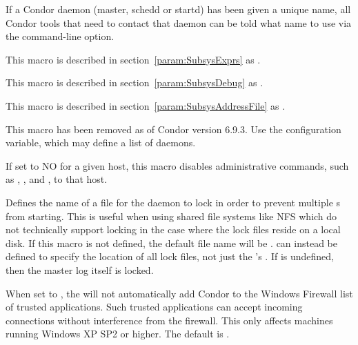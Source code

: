 \begin{description}
  If a Condor daemon (master, schedd or startd) has been given a
  unique name, all Condor tools that need to contact that daemon can
  be told what name to use via the  command-line option.


\label{param:MasterExprs}
\item[\Macro{MASTER\_ATTRS}]
  This macro is described in section~\ref{param:SubsysExprs} as
  .

\label{param:MasterDebug}
\item[\Macro{MASTER\_DEBUG}]
  This macro is described in section~\ref{param:SubsysDebug} as
  .

\label{param:MasterAddressFile}
\item[\Macro{MASTER\_ADDRESS\_FILE}]
  This macro is described in
  section~\ref{param:SubsysAddressFile} as
  . 

\label{param:SecondaryCollectorList}
\item[\Macro{SECONDARY\_COLLECTOR\_LIST}]
  This macro has been removed as of Condor version 6.9.3.
  Use the  configuration variable, which may define a
  list of  daemons.

\label{param:AllowAdminCommands}
\item[\Macro{ALLOW\_ADMIN\_COMMANDS}]
  If set to NO for a given host, this
  macro disables administrative commands, such as 
  , , and , to that host.

\label{param:MasterInstanceLock}
\item[\Macro{MASTER\_INSTANCE\_LOCK}]
  Defines the name of a file for the  daemon
  to lock in order to prevent multiple s
  from starting.
  This is useful when using shared file systems like NFS which do
  not technically support locking in the case where the lock files
  reside on a local disk.
  If this macro is not defined, the default file name will be
  .
   can instead be defined to
  specify the location of all lock files, not just the 
  's .
  If  is undefined, then the master log itself is locked.

\label{param:AddWindowsFirewallException}
\item[\Macro{ADD\_WINDOWS\_FIREWALL\_EXCEPTION}]
  When set to , the
   will not automatically add Condor to the Windows
  Firewall list of trusted applications. Such trusted applications can
  accept incoming connections without interference from the firewall. This
  only affects machines running Windows XP SP2 or higher. The default
  is .


\end{description}
